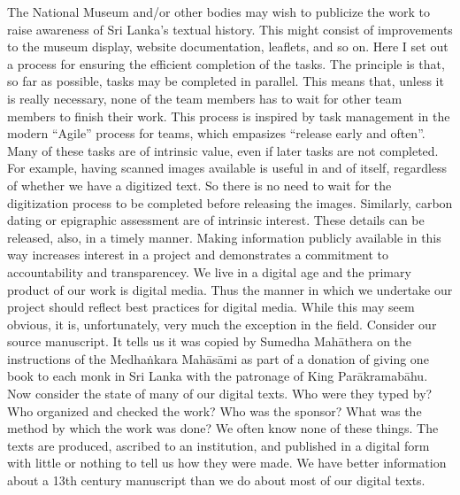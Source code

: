 \markdownRendererOlEndTight \markdownRendererInterblockSeparator
{}\markdownRendererInterblockSeparator
{}The National Museum and/or other bodies may wish to publicize the work to raise awareness of Sri Lanka’s textual history. This might consist of improvements to the museum display, website documentation, leaflets, and so on.\markdownRendererInterblockSeparator
{}\markdownRendererInterblockSeparator
{}Here I set out a process for ensuring the efficient completion of the tasks. The principle is that, so far as possible, tasks may be completed in parallel. This means that, unless it is really necessary, none of the team members has to wait for other team members to finish their work. This process is inspired by task management in the modern “Agile” process for teams, which empasizes “release early and often”.\markdownRendererInterblockSeparator
{}Many of these tasks are of intrinsic value, even if later tasks are not completed. For example, having scanned images available is useful in and of itself, regardless of whether we have a digitized text. So there is no need to wait for the digitization process to be completed before releasing the images. Similarly, carbon dating or epigraphic assessment are of intrinsic interest. These details can be released, also, in a timely manner. Making information publicly available in this way increases interest in a project and demonstrates a commitment to accountability and transparencey.\markdownRendererInterblockSeparator
{}\markdownRendererInterblockSeparator
{}\markdownRendererInterblockSeparator
{}We live in a digital age and the primary product of our work is digital media. Thus the manner in which we undertake our project should reflect best practices for digital media. While this may seem obvious, it is, unfortunately, very much the exception in the field.\markdownRendererInterblockSeparator
{}Consider our source manuscript. It tells us it was copied by Sumedha Mahāthera on the instructions of the Medhaṅkara Mahāsāmi as part of a donation of giving one book to each monk in Sri Lanka with the patronage of King Parākramabāhu.\markdownRendererInterblockSeparator
{}Now consider the state of many of our digital texts. Who were they typed by? Who organized and checked the work? Who was the sponsor? What was the method by which the work was done? We often know none of these things. The texts are produced, ascribed to an institution, and published in a digital form with little or nothing to tell us how they were made. We have better information about a 13th century manuscript than we do about most of our digital texts.\markdownRendererInterblockSeparator
